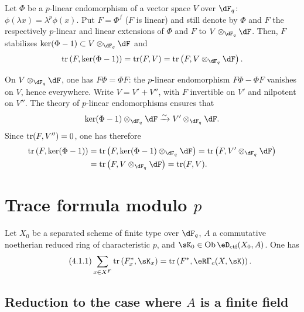 \begin{lemma_}\label{III:3-8}
Let $\Phi$ be a $p$-linear endomorphism of a vector space $V$ over
$\dF_q$: $\phi(\lambda x) = \lambda^p\phi(x)$. Put $F=\Phi^f$ ($F$ is
linear) and still denote by $\Phi$ and $F$ the respectively
$p$-linear and linear extensions of $\Phi$ and $F$ to $V\otimes_{\dF_q}\dF$. Then, $F$ stabilizes
$\ker(\Phi-1)\subset V\otimes_{\dF_q}\dF$ and
\[
  \tr\left(F,\ker(\Phi-1)\right) = \tr(F,V) = \tr\left(F,V\otimes_{\dF_q}\dF\right) \text{.}
\]
\end{lemma_}

On $V\otimes_{\dF_q}\dF$, one has $F\Phi = \Phi F$: the $p$-linear endomorphism
$F\Phi-\Phi F$ vanishes on $V$, hence everywhere. Write $V=V'+V''$, with $F$
invertible on $V'$ and nilpotent on $V''$. The theory of $p$-linear
endomorphisms ensures that
\[
  \ker(\Phi-1)\otimes_{\dF_q}\dF \iso V'\otimes_{\dF_q}\dF \text{.}
\]
Since $\operatorname{tr}(F,V'') = 0$, one has therefore
\begin{align*}
  \tr\left(F,\ker(\Phi-1)\right)
    &= \tr\left(F,\ker(\Phi-1)\otimes_{\dF_q}\dF\right) = \tr\left(F,V'\otimes_{\dF_q}\dF\right) \\
    &= \tr\left(F,V\otimes_{\dF_q}\dF\right) = \tr(F,V) \text{.}
\end{align*}










\section{Trace formula modulo \texorpdfstring{$p$}{p}}\label{III:4}




\begin{theorem_}\label{III:4-1}
Let $X_0$ be a separated scheme of finite type over $\dF_q$, $A$ a
commutative noetherian reduced ring of characteristic $p$, and
$\sK_0\in\ob\eD_\textnormal{ctf}(X_0,A)$. One has
\begin{equation*}\tag{4.1.1}\label{III:eq:4-1-1}
  \sum_{x\in X^F} \tr\left(F_x^*,\sK_x\right) = \tr\left(F^*,\eR\Gamma_c(X,\sK)\right) \text{.}
\end{equation*}
\end{theorem_}




\subsection{Reduction to the case where \texorpdfstring{$A$}{A} is a finite field}\label{III:4-2}

